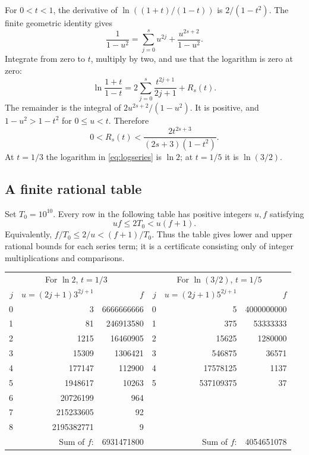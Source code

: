 \documentclass[11pt]{article}
\theoremstyle{definition}
\theoremstyle{remark}
\numberwithin{equation}{section}
\begin{document}
For \(0<t<1\), the derivative of
\(\ln((1+t)/(1-t))\) is \(2/(1-t^2)\).
The finite geometric identity gives
\[
 \frac1{1-u^2}=\sum_{j=0}^{s}u^{2j}
                +\frac{u^{2s+2}}{1-u^2}.
\]
Integrate from zero to \(t\), multiply by two, and use that the
logarithm is zero at zero:
\begin{equation}\label{eq:logseries}
 \ln\frac{1+t}{1-t}
 =2\sum_{j=0}^{s}\frac{t^{2j+1}}{2j+1}+R_s(t).
\end{equation}
The remainder is the integral of \(2u^{2s+2}/(1-u^2)\).
It is positive, and \(1-u^2>1-t^2\) for \(0\le u<t\).
Therefore
\begin{equation}\label{eq:logremainder}
 0<R_s(t)<\frac{2t^{2s+3}}{(2s+3)(1-t^2)}.
\end{equation}
At \(t=1/3\) the logarithm in \eqref{eq:logseries} is \(\ln2\);
at \(t=1/5\) it is \(\ln(3/2)\).

\subsection{A finite rational table}

Set \(T_0=10^{10}\).
Every row in the following table has positive integers \(u,f\)
satisfying
\[
 uf\le2T_0<u(f+1).
\]
Equivalently, \(f/T_0\le2/u<(f+1)/T_0\).
Thus the table gives lower and upper rational bounds for each
series term; it is a certificate consisting only of integer
multiplications and comparisons.

\begin{center}
\begin{tabular}{rrr@{\qquad}rrr}
\toprule
\multicolumn{3}{c}{For \(\ln2\), \(t=1/3\)}&
\multicolumn{3}{c}{For \(\ln(3/2)\), \(t=1/5\)}\\
\(j\)&\(u=(2j+1)3^{2j+1}\)&\(f\)&
\(j\)&\(u=(2j+1)5^{2j+1}\)&\(f\)\\
\midrule
0&3&6666666666&0&5&4000000000\\
1&81&246913580&1&375&53333333\\
2&1215&16460905&2&15625&1280000\\
3&15309&1306421&3&546875&36571\\
4&177147&112900&4&17578125&1137\\
5&1948617&10263&5&537109375&37\\
6&20726199&964&&&\\
7&215233605&92&&&\\
8&2195382771&9&&&\\
\midrule
\multicolumn{2}{r}{Sum of \(f\):}&6931471800&
\multicolumn{2}{r}{Sum of \(f\):}&4054651078\\
\bottomrule
\end{tabular}
\end{center}
\end{document}
